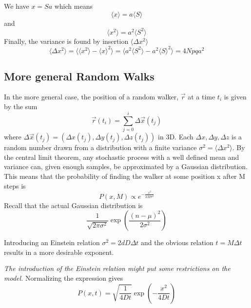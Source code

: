 We have $x=Sa$ which means 
$$\langle x\rangle=a\langle S\rangle$$ 
and 
$$\langle x^2\rangle=a^2\langle S^2\rangle$$
Finally, the variance is found by insertion $\langle \Delta x^2\rangle$
\begin{equation}\label{random_walk_variance}
 \langle \Delta x^2\rangle = \langle\langle x^2\rangle -\langle x\rangle^2\rangle = \langle a^2\langle S^2\rangle -a^2\langle S\rangle^2\rangle = 4Npqa^2
\end{equation}


\subsection{More general Random Walks}\label{more_general_random_walks}

In the more general case, the position of a random walker, $\vec{r}$ at a time $t_i$ is given by the sum
\begin{equation}\label{brownian_motion}
 \vec{r}(t_i)=\sum\limits_{j=0}^i \Delta \vec{x}(t_j)
\end{equation}
where $\Delta \vec{x}(t_j) = \left(\Delta x(t_j),\Delta y(t_j),\Delta z(t_j)\right)$ in 3D. Each $\Delta x,\Delta y,\Delta z$ is a random number drawn from a distribution with a finite variance $\sigma^2 = \langle\Delta x^2\rangle$. 
By the central limit theorem, any stochastic process with a well defined mean and variance can, given enough samples, be approximated by a Gaussian distribution. 
This means that the probability of finding the walker at some position x after M steps is 
\begin{equation}
 P(x,M)\propto e^{-\frac{x^2}{2M\sigma^2}}
\end{equation}
Recall that the actual Gaussian distribution is 
$$
\frac{1}{\sqrt{2\pi\sigma^2}}\exp\left(\frac{(n-\mu)^2}{2\sigma^2}\right)
$$

Introducing an Einstein relation $\sigma^2 = 2dD\Delta t$ and the obvious relation $t = M\Delta t$ results in a more desirable exponent. 

\emph{The introduction of the Einstein relation might put some restrictions on the model.}
Normalizing the expression gives
\begin{equation}\label{rw_gaussian_distribution}
 P(x,t) = \sqrt{\frac{1}{4Dt}}\exp\left(-\frac{x^2}{4Dt}\right)
\end{equation}

